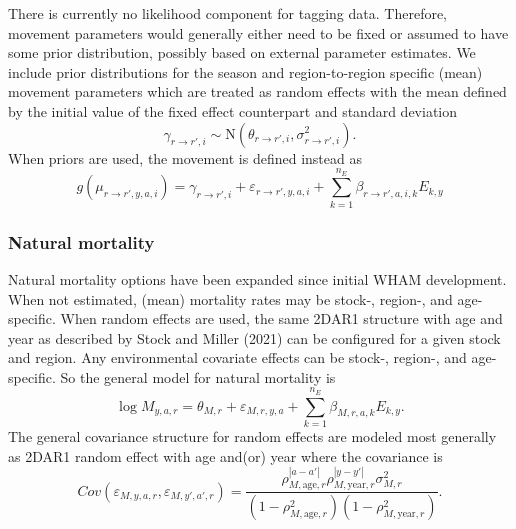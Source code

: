 \documentclass[
]{article}
\begin{document}
There is currently no likelihood component for tagging data. Therefore,
movement parameters would generally either need to be fixed or assumed
to have some prior distribution, possibly based on external parameter
estimates. We include prior distributions for the season and
region-to-region specific (mean) movement parameters which are treated
as random effects with the mean defined by the initial value of the
fixed effect counterpart and standard deviation \begin{equation*}
  \gamma_{r\rightarrow r',i} \sim \text{N}\left(\theta_{r\rightarrow r',i}, \sigma^2_{r\rightarrow r',i}\right).
  \end{equation*} When priors are used, the movement is defined instead
as \begin{equation*}
  g(\mu_{r\rightarrow r',y,a,i}) = \gamma_{r\rightarrow r',i} + \varepsilon_{r\rightarrow r',y,a,i} + \sum^{n_E}_{k=1} \beta_{r\rightarrow r',a,i,k} E_{k,y} 
  \end{equation*}

\hypertarget{natural-mortality}{%
\subsubsection*{Natural mortality}\label{natural-mortality}}

Natural mortality options have been expanded since initial WHAM
development. When not estimated, (mean) mortality rates may be stock-,
region-, and age-specific. When random effects are used, the same 2DAR1
structure with age and year as described by Stock and Miller (2021) can
be configured for a given stock and region. Any environmental covariate
effects can be stock-, region-, and age-specific. So the general model
for natural mortality is \begin{equation*}
  \log M_{y,a,r} = \theta_{M,r} + \varepsilon_{M,r,y,a} + \sum^{n_E}_{k=1} \beta_{M,r,a,k} E_{k,y}.
\end{equation*} The general covariance structure for random effects are
modeled most generally as 2DAR1 random effect with age and(or) year
where the covariance is \begin{equation*}
  Cov\left(\varepsilon_{M,y,a,r},\varepsilon_{M,y',a',r}\right) =   \frac{\rho_{M,\text{age},r}^{|a-a'|}\rho_{M,\text{year},r}^{|y-y'|}\sigma^2_{M,r}}{\left(1 -  \rho_{M,\text{age},r}^2\right)\left(1 - \rho_{M,\text{year},r}^2\right)}.
\end{equation*}
\end{document}
